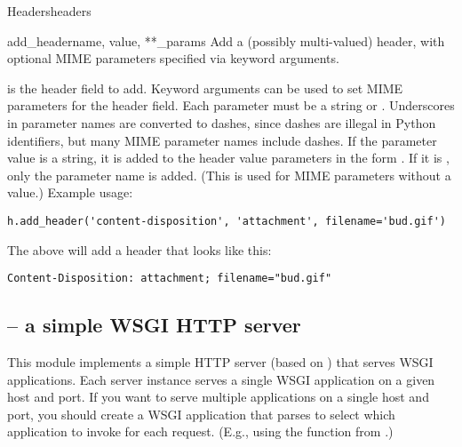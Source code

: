 \begin{classdesc}{Headers}{headers}
\begin{methoddesc}{add_header}{name, value, **_params}
Add a (possibly multi-valued) header, with optional MIME parameters
specified via keyword arguments.

 is the header field to add.  Keyword arguments can be used to
set MIME parameters for the header field.  Each parameter must be a
string or .  Underscores in parameter names are converted to
dashes, since dashes are illegal in Python identifiers, but many MIME
parameter names include dashes.  If the parameter value is a string, it
is added to the header value parameters in the form .
If it is , only the parameter name is added.  (This is used
for MIME parameters without a value.)  Example usage:

\begin{verbatim}
h.add_header('content-disposition', 'attachment', filename='bud.gif')
\end{verbatim}

The above will add a header that looks like this:

\begin{verbatim}
Content-Disposition: attachment; filename="bud.gif"
\end{verbatim}
\end{methoddesc}
\end{classdesc}

\subsection{ -- a simple WSGI HTTP server}

This module implements a simple HTTP server (based on
) that serves WSGI applications.  Each server
instance serves a single WSGI application on a given host and port.  If
you want to serve multiple applications on a single host and port, you
should create a WSGI application that parses  to select
which application to invoke for each request.  (E.g., using the
 function from .)


